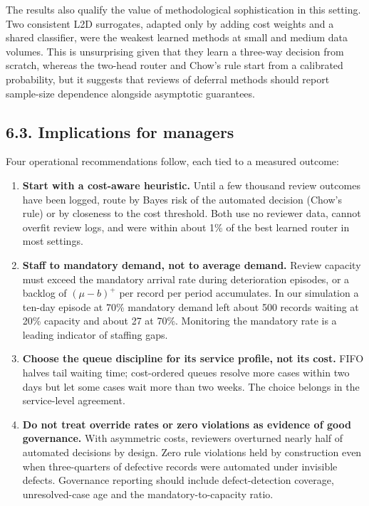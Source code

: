 \documentclass[
  11pt,
]{article}
\providecommand{\tightlist}{%
  \setlength{\itemsep}{0pt}\setlength{\parskip}{0pt}}
\begin{document}
The results also qualify the value of methodological sophistication in
this setting. Two consistent L2D surrogates, adapted only by adding cost
weights and a shared classifier, were the weakest learned methods at
small and medium data volumes. This is unsurprising given that they
learn a three-way decision from scratch, whereas the two-head router and
Chow's rule start from a calibrated probability, but it suggests that
reviews of deferral methods should report sample-size dependence
alongside asymptotic guarantees.

\hypertarget{implications-for-managers}{%
\subsection{6.3. Implications for
managers}\label{implications-for-managers}}

Four operational recommendations follow, each tied to a measured
outcome:

\begin{enumerate}
\def\labelenumi{\arabic{enumi}.}
\tightlist
\item
  \textbf{Start with a cost-aware heuristic.} Until a few thousand
  review outcomes have been logged, route by Bayes risk of the automated
  decision (Chow's rule) or by closeness to the cost threshold. Both use
  no reviewer data, cannot overfit review logs, and were within about
  1\% of the best learned router in most settings.
\item
  \textbf{Staff to mandatory demand, not to average demand.} Review
  capacity must exceed the mandatory arrival rate during deterioration
  episodes, or a backlog of \((\mu-b)^+\) per record per period
  accumulates. In our simulation a ten-day episode at 70\% mandatory
  demand left about 500 records waiting at 20\% capacity and about 27 at
  70\%. Monitoring the mandatory rate is a leading indicator of staffing
  gaps.
\item
  \textbf{Choose the queue discipline for its service profile, not its
  cost.} FIFO halves tail waiting time; cost-ordered queues resolve more
  cases within two days but let some cases wait more than two weeks. The
  choice belongs in the service-level agreement.
\item
  \textbf{Do not treat override rates or zero violations as evidence of
  good governance.} With asymmetric costs, reviewers overturned nearly
  half of automated decisions by design. Zero rule violations held by
  construction even when three-quarters of defective records were
  automated under invisible defects. Governance reporting should include
  defect-detection coverage, unresolved-case age and the
  mandatory-to-capacity ratio.
\end{enumerate}
\end{document}
